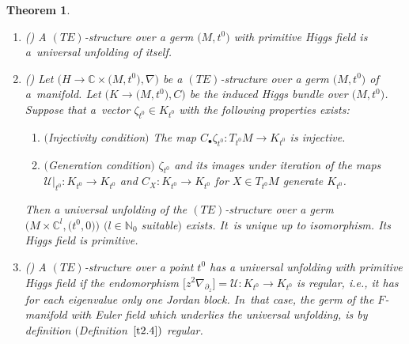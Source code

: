 \documentclass[10pt,a4paper]{amsart}
\numberwithin{equation}{section}
\numberwithin{figure}{section}
\newcommand{\N}{{\mathbb N}}
\newcommand{\C}{{\mathbb C}}
\newcommand{\UU}{{\mathcal U}}
\newcommand{\paa}{\partial}
\newcommand{\nnn}{\nabla}
\newtheorem{Theorem}{Theorem}[section]
\begin{document}
\begin{Theorem}\label{t3.16}\qquad

\begin{enumerate}\itemsep=0pt
\item[$(a)$] {\rm (\cite[Theorem~2.5]{HM04})}
A $(TE)$-structure over a germ $\big(M,t^0\big)$ with
primitive Higgs field is a~universal unfolding of itself.

\item[$(b)$] {\rm (\cite[Theorem~2.5]{HM04})}
Let $\big(H\to\C\times\big(M,t^0\big),\nnn\big)$ be a $(TE)$-structure over
a germ $\big(M,t^0\big)$ of a~manifold.
Let $\big(K\to \big(M,t^0\big),C\big)$ be the induced Higgs bundle over
$\big(M,t^0\big)$. Suppose that a~vec\-tor $\zeta_{t^0}\in K_{t^0}$
with the following properties exists:
\begin{enumerate}\itemsep=0pt\setlength{\leftskip}{0.25cm}
\item[$(IC)$] $($Injectivity condition$)$ The map
$C_\bullet \zeta_{t^0}\colon T_{t^0}M\to K_{t^0}$ is injective.
\item[$(GC)$] $($Generation condition$)$ $\zeta_{t^0}$ and
its images under iteration of the maps
$\UU|_{t^0}\colon K_{t^0}\to K_{t^0}$ and $C_X\colon K_{t^0}\to K_{t^0}$
for $X\in T_{t^0}M$ generate $K_{t^0}$.
\end{enumerate}
Then a universal unfolding of the $(TE)$-structure over
a germ $\big(M\times \C^l,\big(t^0,0\big)\big)$ $(l\in\N_0$ suitable$)$
exists. It~is unique up to isomorphism.
Its Higgs field is primitive.

\item[$(c)$] {\rm (\cite{Ma86})} A $(TE)$-structure over a point $t^0$ has
a universal unfolding with primitive Higgs field
if the endomorphism
$\big[z^2\nnn_{\paa_z}\big]=\UU\colon K_{t^0}\to K_{t^0}$
is regular, i.e., it has for each eigenvalue only one
Jordan block. In~that case, the germ of the $F$-manifold with Euler field
which underlies the universal unfolding,
is by definition $($Definition~$\ref{t2.4})$ regular.
\end{enumerate}
\end{Theorem}
\end{document}
